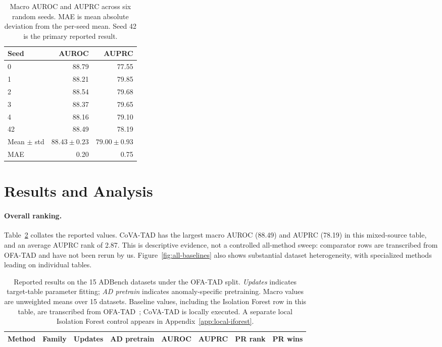 \documentclass{article}
\begin{document}
\begin{table}[t]
\centering
\caption{Macro AUROC and AUPRC across six random seeds. MAE is mean absolute deviation from the per-seed mean. Seed 42 is the primary reported result.}
\label{tab:seeds}
\small
\setlength{\tabcolsep}{8pt}
\begin{tabular}{lrr}
\toprule
Seed & AUROC & AUPRC \\
\midrule
0  & 88.79 & 77.55 \\
1  & 88.21 & 79.85 \\
2  & 88.54 & 79.68 \\
3  & 88.37 & 79.65 \\
4  & 88.16 & 79.10 \\
42 & 88.49 & 78.19 \\
\midrule
Mean $\pm$ std & $88.43 \pm 0.23$ & $79.00 \pm 0.93$ \\
MAE & 0.20 & 0.75 \\
\bottomrule
\end{tabular}
\end{table}

\section{Results and Analysis}
\label{sec:analysis}

\paragraph{Overall ranking.}
Table~\ref{tab:all-baselines} collates the reported values. CoVA-TAD has the largest macro AUROC (88.49) and AUPRC (78.19) in this mixed-source table, and an average AUPRC rank of 2.87. This is descriptive evidence, not a controlled all-method sweep: comparator rows are transcribed from OFA-TAD and have not been rerun by us. Figure~\ref{fig:all-baselines} also shows substantial dataset heterogeneity, with specialized methods leading on individual tables.

\begin{table}[t]
\centering
\caption{Reported results on the 15 ADBench datasets under the OFA-TAD split. \textit{Updates} indicates target-table parameter fitting; \textit{AD pretrain} indicates anomaly-specific pretraining. Macro values are unweighted means over 15 datasets. Baseline values, including the Isolation Forest row in this table, are transcribed from OFA-TAD~\citep{li2026towards}; CoVA-TAD is locally executed. A separate local Isolation Forest control appears in Appendix~\ref{app:local-iforest}.}
\label{tab:all-baselines}
\small
\setlength{\tabcolsep}{3.9pt}
\begin{tabular}{llllrrrr}
\toprule
Method & Family & Updates & AD pretrain & AUROC & AUPRC & PR rank & PR wins\\
\midrule
%
\end{tabular}
\end{table}
\end{document}
